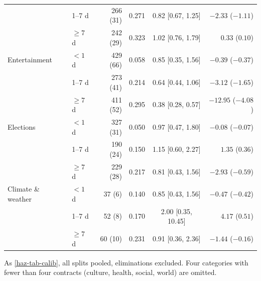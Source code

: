 \begin{table}[ht]
\begin{threeparttable}
\begin{tabular}{@{}llrrcr@{}}
                   & 1--7 d  &    266 (31)  & 0.271 & 0.82 [0.67, 1.25] & $-2.33$ ($-1.11$) \\
                   & $\ge7$ d &    242 (29)  & 0.323 & 1.02 [0.76, 1.79] & $0.33$ ($0.10$) \\
Entertainment      & $<1$ d  &    429 (66)  & 0.058 & 0.85 [0.35, 1.56] & $-0.39$ ($-0.37$) \\
                   & 1--7 d  &    273 (41)  & 0.214 & 0.64 [0.44, 1.06] & $-3.12$ ($-1.65$) \\
                   & $\ge7$ d &    411 (52)  & 0.295 & 0.38 [0.28, 0.57] & $-12.95$ ($-4.08$) \\
Elections          & $<1$ d  &    327 (31)  & 0.050 & 0.97 [0.47, 1.80] & $-0.08$ ($-0.07$) \\
                   & 1--7 d  &    190 (24)  & 0.150 & 1.15 [0.60, 2.27] & $1.35$ ($0.36$) \\
                   & $\ge7$ d &    229 (28)  & 0.217 & 0.81 [0.43, 1.56] & $-2.93$ ($-0.59$) \\
Climate \& weather & $<1$ d  &     37 (6)   & 0.140 & 0.85 [0.43, 1.56] & $-0.47$ ($-0.42$) \\
                   & 1--7 d  &     52 (8)   & 0.170 & 2.00 [0.35, 10.45] & $4.17$ ($0.51$) \\
                   & $\ge7$ d &     60 (10)  & 0.231 & 0.91 [0.36, 2.36] & $-1.44$ ($-0.16$) \\
\bottomrule
\end{tabular}
\begin{tablenotes}\footnotesize
\item As \cref{haz-tab-calib}, all splits pooled, eliminations excluded. Four categories with fewer
than four contracts (culture, health, social, world) are omitted.
\end{tablenotes}
\end{threeparttable}
\end{table}

